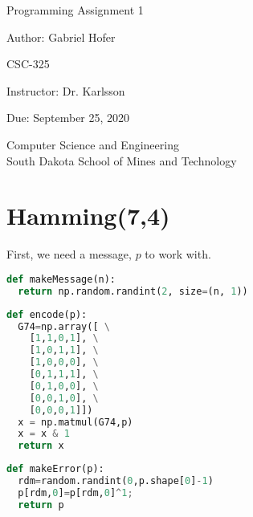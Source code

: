 \documentclass[12pt]{article}
\begin{document}
\begin{titlepage}
   \begin{center}
       \vspace*{1cm}
       \Large
       Programming Assignment 1
       \normalsize

       \vspace{0.5cm}

       Author: Gabriel Hofer

       \vspace{0.5cm}

       CSC-325

       \vspace{0.5cm}

       Instructor: Dr. Karlsson

       \vspace{0.5cm}

       Due: September 25, 2020

       \vfill

       Computer Science and Engineering\\
       South Dakota School of Mines and Technology\\
   \end{center}
\end{titlepage}


\newpage
\section*{Hamming(7,4)}

First, we need a message, $p$ to work with.
\begin{lstlisting}[frame=single,language=Python,caption=makeMessage \label{code:makeMessage}]
def makeMessage(n): 
  return np.random.randint(2, size=(n, 1))
\end{lstlisting}

\begin{lstlisting}[frame=single,language=Python,caption=encode74 \label{code:something something}]
def encode(p):
  G74=np.array([ \
    [1,1,0,1], \
    [1,0,1,1], \
    [1,0,0,0], \
    [0,1,1,1], \
    [0,1,0,0], \
    [0,0,1,0], \
    [0,0,0,1]])
  x = np.matmul(G74,p)
  x = x & 1
  return x
\end{lstlisting}
\begin{lstlisting}[frame=single,language=Python,caption=encode74 \label{code:something something}]
def makeError(p): 
  rdm=random.randint(0,p.shape[0]-1)
  p[rdm,0]=p[rdm,0]^1;
  return p
\end{lstlisting}
\end{document}
